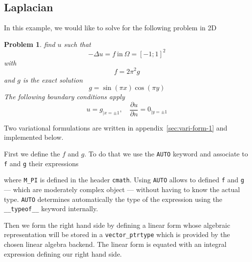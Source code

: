 \documentclass[11pt]{article}
\newtheorem{problem}{Problem}
\begin{document}
\subsection{Laplacian}
\label{sec:defin-bilin-forms}

In this example, we would like to solve for the following problem in 2D
\begin{problem}
\label{prob:1}
 find $u$ such that
\begin{equation}
  \label{eq:1}
  -\Delta u = f\ \text{in}\ \Omega = [-1;1]^2
\end{equation}
with
\begin{equation}
  \label{eq:2}
  f= 2 \pi^2  g
\end{equation}
and $g$ is the exact solution
\begin{equation}
  \label{eq:3}
  g=\sin(\pi x) \cos(\pi y)
\end{equation}
The following boundary conditions apply
\begin{equation}
  \label{eq:4}
  u=g_{|x=\pm 1}, \quad \frac{\partial u}{\partial n} = 0_{|y=\pm 1}
\end{equation}
\end{problem}

\noindent
Two variational formulations are written in
appendix~\ref{sec:vari-form-1} and implemented below.


First we define the $f$ and $g$. To do that we use the
\lstinline!AUTO! keyword and associate to \lstinline!f! and
\lstinline!g! their expressions



\noindent where \lstinline!M_PI! is defined in the header
\lstinline!cmath!.  Using \lstinline!AUTO! allows to defined
\lstinline!f!  and \lstinline!g! --- which are moderately complex
object --- without having to know the actual type. \lstinline!AUTO!
determines automatically the type of the expression using the
\lstinline!__typeof__! keyword internally.

Then we form the right hand side by defining a linear form whose
algebraic representation will be stored in a
\lstinline!vector_ptrtype! which is provided by the chosen linear
algebra backend. The linear form is equated with an integral
expression defining our right hand side.


\end{document}
